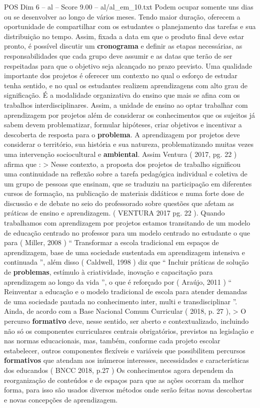 \begin{textsample}{POS Dim 6 – al – Score 9.00 – al/al\_em\_10.txt}
Podem ocupar somente uns dias ou se desenvolver ao longo de vários meses.
Tendo maior duração, oferecem a oportunidade de compartilhar com os estudantes o planejamento das tarefas e sua distribuição no tempo.
Assim, fixada a data em que o produto final deve estar pronto, é possível discutir um \textbf{cronograma} e definir as etapas necessárias, as responsabilidades que cada grupo deve assumir e as datas que terão de ser respeitadas para que o objetivo seja alcançado no prazo previsto.
Uma qualidade importante dos projetos é oferecer um contexto no qual o esforço de estudar tenha sentido, e no qual os estudantes realizem aprendizagens com alto grau de significação.
É a modalidade organizativa do ensino que mais se afina com os trabalhos interdisciplinares.
Assim, a unidade de ensino ao optar trabalhar com aprendizagem por projetos além de considerar os conhecimentos que os sujeitos já sabem devem problematizar, formular hipóteses, criar objetivos e incentivar a descoberta de resposta para o \textbf{problema}.
A aprendizagem por projetos deve considerar o território, sua história e sua natureza, problematizando muitas vezes uma intervenção sociocultural e \textbf{ambiental}.
Assim Ventura ( 2017, pg. 22 ) afirma que : > Nesse contexto, a proposta dos projetos de trabalho significou uma continuidade na reflexão sobre a tarefa pedagógica individual e coletiva de um grupo de pessoas que ensinam, que se traduziu na participação em diferentes cursos de formação, na publicação de materiais didáticos e numa forte dose de discussão e de debate no seio do professorado sobre questões que afetam as práticas de ensino e aprendizagem. ( VENTURA 2017 pg. 22 ).
Quando trabalhamos com aprendizagem por projetos estamos transitando de um modelo de educação centrado no professor para um modelo centrado no estudante o que para ( Miller, 2008 ) “ Transformar a escola tradicional em espaços de aprendizagem, base de uma sociedade sustentada em aprendizagem intensiva e continuada ”, além disso ( Caldwell, 1998 ) diz que “ Incluir práticas de solução de \textbf{problemas}, estímulo à criatividade, inovação e capacitação para aprendizagem ao longo da vida ”, o que é reforçado por ( Araújo, 2011 ) “ Reinventar a educação e o modelo tradicional de escola para atender demandas de uma sociedade pautada no conhecimento inter, multi e transdisciplinar ”.
Ainda, de acordo com a Base Nacional Comum Curricular ( 2018, p. 27 ), > O percurso \textbf{formativo} deve, nesse sentido, ser aberto e contextualizado, incluindo não só os componentes curriculares centrais obrigatórios, previstos na legislação e nas normas educacionais, mas, também, conforme cada projeto escolar estabelecer, outros componentes flexíveis e variáveis que possibilitem percursos \textbf{formativos} que atendam aos inúmeros interesses, necessidades e características dos educandos ( BNCC 2018, p.27 ) Os conhecimentos agora dependem da reorganização de conteúdos e de espaços para que as ações ocorram da melhor forma, para isso são usados diversos métodos onde serão feitas novas descobertas e novas concepções de aprendizagem.

\end{textsample}
